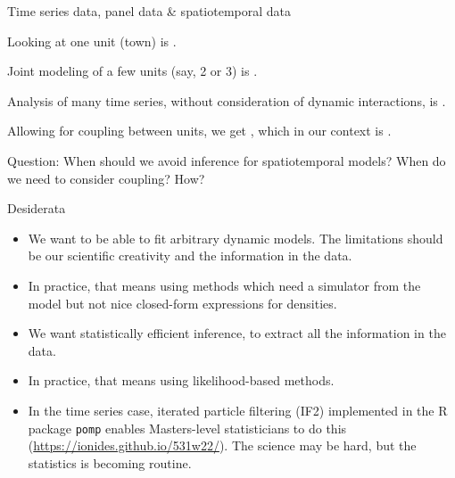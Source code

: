 \documentclass{beamer}
\begin{document}
\begin{frame}{Time series data, panel data \& spatiotemporal data}

  \bi
\item Looking at one unit (town) is .

  \item Joint modeling of a few units (say, 2 or 3) is .

\item Analysis of many time series, without consideration of dynamic interactions, is .

\item Allowing for coupling between units, we get , which in our context is .

  \ei
  
Question: When should we avoid inference for spatiotemporal models? When do we need to consider coupling? How?

\end{frame}

\begin{frame}{Desiderata}

  \begin{itemize}
    \item We want to be able to fit arbitrary dynamic models. The limitations should be our scientific creativity and the information in the data.

    \item In practice, that means using  methods which need a simulator from the model but not nice closed-form expressions for densities.

    \item We want statistically efficient inference, to extract all the information in the data.

    \item In practice, that means using likelihood-based methods.

      \item  In the time series case, iterated particle filtering (IF2) implemented in the R package \texttt{pomp} enables Masters-level statisticians to do this (\url{https://ionides.github.io/531w22/}). The science may be hard, but the statistics is becoming routine.
      \end{itemize}
  \end{frame}
\end{document}
